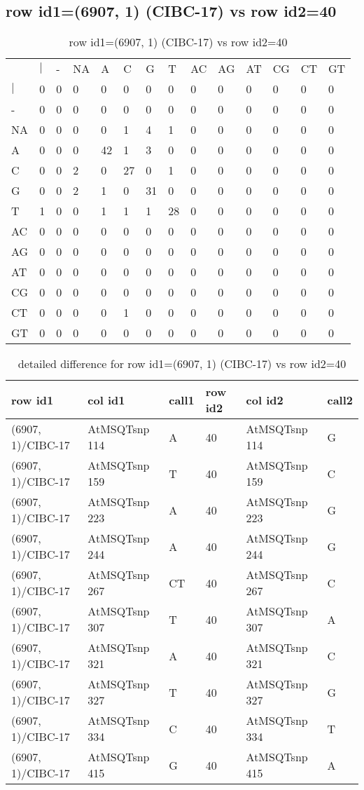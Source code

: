 \subsection{row id1=(6907, 1) (CIBC-17) vs row id2=40}
\begin{center}
\begin{longtable}{|l|l|l|l|l|l|l|l|l|l|l|l|l|l|}
\caption{row id1=(6907, 1) (CIBC-17) vs row id2=40} \label{table_dm76}\\
\hline
\\
\hline
&$|$&-&NA&A&C&G&T&AC&AG&AT&CG&CT&GT\\
$|$&0&0&0&0&0&0&0&0&0&0&0&0&0\\
-&0&0&0&0&0&0&0&0&0&0&0&0&0\\
NA&0&0&0&0&1&4&1&0&0&0&0&0&0\\
A&0&0&0&42&1&3&0&0&0&0&0&0&0\\
C&0&0&2&0&27&0&1&0&0&0&0&0&0\\
G&0&0&2&1&0&31&0&0&0&0&0&0&0\\
T&1&0&0&1&1&1&28&0&0&0&0&0&0\\
AC&0&0&0&0&0&0&0&0&0&0&0&0&0\\
AG&0&0&0&0&0&0&0&0&0&0&0&0&0\\
AT&0&0&0&0&0&0&0&0&0&0&0&0&0\\
CG&0&0&0&0&0&0&0&0&0&0&0&0&0\\
CT&0&0&0&0&1&0&0&0&0&0&0&0&0\\
GT&0&0&0&0&0&0&0&0&0&0&0&0&0\\
\hline
\end{longtable}
\end{center}

\begin{center}
\begin{longtable}{|l|l|l|l|l|l|}
\caption{detailed difference for row id1=(6907, 1) (CIBC-17) vs row id2=40} \label{table_dm77}\\
\hline
row id1&col id1&call1&row id2&col id2&call2\\
\hline
(6907, 1)/CIBC-17&AtMSQTsnp 114&A&40&AtMSQTsnp 114&G\\
(6907, 1)/CIBC-17&AtMSQTsnp 159&T&40&AtMSQTsnp 159&C\\
(6907, 1)/CIBC-17&AtMSQTsnp 223&A&40&AtMSQTsnp 223&G\\
(6907, 1)/CIBC-17&AtMSQTsnp 244&A&40&AtMSQTsnp 244&G\\
(6907, 1)/CIBC-17&AtMSQTsnp 267&CT&40&AtMSQTsnp 267&C\\
(6907, 1)/CIBC-17&AtMSQTsnp 307&T&40&AtMSQTsnp 307&A\\
(6907, 1)/CIBC-17&AtMSQTsnp 321&A&40&AtMSQTsnp 321&C\\
(6907, 1)/CIBC-17&AtMSQTsnp 327&T&40&AtMSQTsnp 327&G\\
(6907, 1)/CIBC-17&AtMSQTsnp 334&C&40&AtMSQTsnp 334&T\\
(6907, 1)/CIBC-17&AtMSQTsnp 415&G&40&AtMSQTsnp 415&A\\
\hline
\end{longtable}
\end{center}

